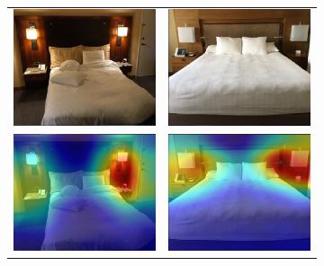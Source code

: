 \begin{figure}[t]
\begin{subfigure}[b]{.48\columnwidth}
\begin{tabular}{cc}
        \end{tabular}
    \end{subfigure}
    \\\vspace{20px}
    \begin{subfigure}[b]{.48\columnwidth}
        \centering
        \begin{tabular}{cc}
            \includegraphics[width=.45\columnwidth]{figures/chapter7/clarification/traffickcam/1_im.png} &
            \includegraphics[width=.45\columnwidth]{figures/chapter7/clarification/traffickcam/2_im.png}\\
            \includegraphics[width=.45\columnwidth]{figures/chapter7/clarification/traffickcam/1_hm.png} &
            \includegraphics[width=.45\columnwidth]{figures/chapter7/clarification/traffickcam/2_hm.png}

\end{tabular}
\end{subfigure}
\end{figure}
